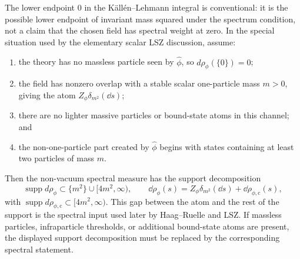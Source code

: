 \begin{remark}
\label{rem:kallen-lehmann-single-massive-support}
The lower endpoint \(0\) in the K\"all\'en--Lehmann integral is conventional:
it is the possible lower endpoint of invariant mass squared under the spectrum
condition, not a claim that the chosen field has spectral weight at zero.  In
the special situation used by the elementary scalar LSZ discussion, assume:

\begin{enumerate}[label=(\roman*)]
  \item the theory has no massless particle seen by \(\widehat\phi\), so
    \(d\rho_\phi(\{0\})=0\);
  \item the field has nonzero overlap with a stable scalar one-particle mass
    \(m>0\), giving the atom \(Z_\phi\delta_{m^2}(\dd s)\);
  \item there are no lighter massive particles or bound-state atoms in this
    channel; and
  \item the non-one-particle part created by \(\widehat\phi\) begins with
    states containing at least two particles of mass \(m\).
\end{enumerate}

Then the non-vacuum spectral measure has the support decomposition
\[
  \operatorname{supp}d\rho_\phi
  \subset
  \{m^2\}\cup[4m^2,\infty),
  \qquad
  \dd\rho_\phi(s)
  =
  Z_\phi\delta_{m^2}(\dd s)+\dd\rho_{\phi,\mathrm c}(s),
\]
with \(\operatorname{supp}d\rho_{\phi,\mathrm c}\subset[4m^2,\infty)\).  This
gap between the atom and the rest of the support is the spectral input used
later by Haag--Ruelle and LSZ.  If massless particles, infraparticle
thresholds, or additional bound-state atoms are present, the displayed support
decomposition must be replaced by the corresponding spectral statement.
\end{remark}

